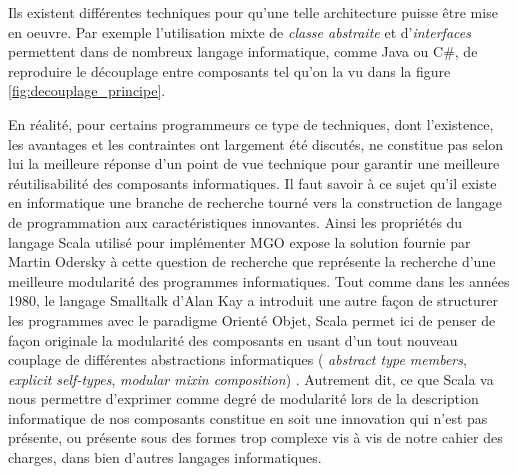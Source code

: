 Ils existent différentes techniques pour qu'une telle architecture puisse être mise en oeuvre. Par exemple l'utilisation mixte de \textit{classe abstraite} et d'\textit{interfaces} permettent dans de nombreux langage informatique, comme Java ou C\#, de reproduire le découplage entre composants tel qu'on la vu dans la figure \ref{fig:decouplage_principe}. 

En réalité, pour certains programmeurs \textcite{Odersky2005}  ce type de techniques, dont l'existence, les avantages et les contraintes ont largement été discutés, ne constitue pas selon lui la meilleure réponse d'un point de vue technique pour garantir une meilleure réutilisabilité des composants informatiques. Il faut savoir à ce sujet qu'il existe en informatique une branche de recherche tourné vers la construction de langage de programmation aux caractéristiques innovantes. Ainsi les propriétés du langage Scala utilisé pour implémenter MGO expose la solution fournie par Martin Odersky à cette question de recherche que représente la recherche d'une meilleure modularité des programmes informatiques. Tout comme dans les années 1980, le langage Smalltalk d'Alan Kay a introduit une autre façon de structurer les programmes avec le paradigme Orienté Objet, Scala permet ici de penser de façon originale la modularité des composants en usant d'un tout nouveau couplage de différentes abstractions informatiques ( \textit{abstract type members}, \textit{explicit self-types}, \textit{modular mixin composition}) . Autrement dit, ce que Scala va nous permettre d'exprimer comme degré de modularité lors de la description informatique de nos composants constitue en soit une innovation qui n'est pas présente, ou présente sous des formes trop complexe vis à vis de notre cahier des charges, dans bien d'autres langages informatiques.



